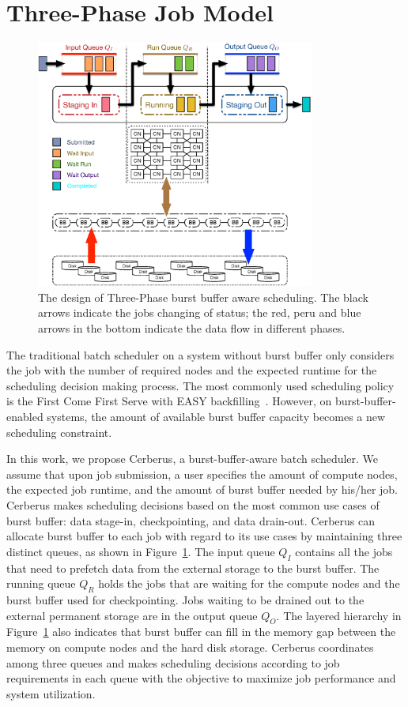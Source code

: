 \section{Three-Phase Job Model}
\label{Sec:Model}

\begin{figure}[htp]
        \centering
        \includegraphics[width=3.6in]{CerberusBBSystem}
        \caption{The design of Three-Phase burst buffer aware scheduling. The black arrows indicate 
        the jobs changing of status; the red, peru and blue arrows in the bottom indicate the data flow in different phases.}
        \label{Fig:CerberusQueues}
\end{figure}

The traditional batch scheduler on a system without burst buffer only considers
the job with the number of required nodes and the expected runtime for the scheduling decision making process.
The most commonly used scheduling policy is the First Come First Serve with EASY backfilling~\cite{tsafrir-tpds-2007}.
However, on burst-buffer-enabled systems,
the amount of available burst buffer capacity becomes a new scheduling constraint.

In this work,
we propose Cerberus, a burst-buffer-aware batch scheduler.
We assume that upon job submission, 
a user specifies the amount of compute nodes, 
the expected job runtime, 
and the amount of burst buffer needed by his/her job. 
Cerberus makes scheduling decisions based on the most common use cases of burst buffer:
data stage-in, checkpointing, and data drain-out.
Cerberus can allocate burst buffer to each job with regard to its use cases
by maintaining three distinct queues, as shown in Figure~\ref{Fig:CerberusQueues}.
The input queue $Q_I$ contains all the jobs that need to prefetch data from the external storage to the burst buffer.
The running queue $Q_R$ holds the jobs that are waiting for the compute nodes and the burst buffer used for checkpointing.
Jobs waiting to be drained out to the external permanent storage are in the output queue $Q_O$.
The layered hierarchy in Figure~\ref{Fig:CerberusQueues} also indicates that burst buffer
can fill in the memory gap between the memory on compute nodes and the hard disk storage.
Cerberus coordinates among three queues and makes scheduling decisions according to job requirements in each queue with the objective to maximize job performance and system utilization.

